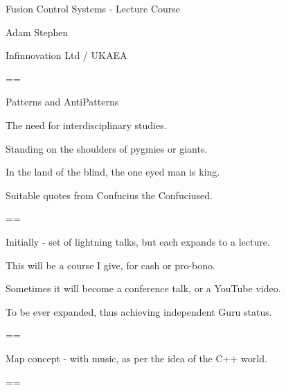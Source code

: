 Fusion Control Systems - Lecture Course

Adam Stephen

Infinnovation Ltd / UKAEA

==

Patterns and AntiPatterns

The need for interdisciplinary studies.

Standing on the shoulders of pygmies or giants.

In the land of the blind, the one eyed man is king.

Suitable quotes from Confucius the Confuciused.

==

Initially - set of lightning talks, but each expands to a lecture.

This will be a course I give, for cash or pro-bono.

Sometimes it will become a conference talk, or a YouTube video.

To be ever expanded, thus achieving independent Guru status.

==

Map concept - with music, as per the idea of the C++ world.

==

